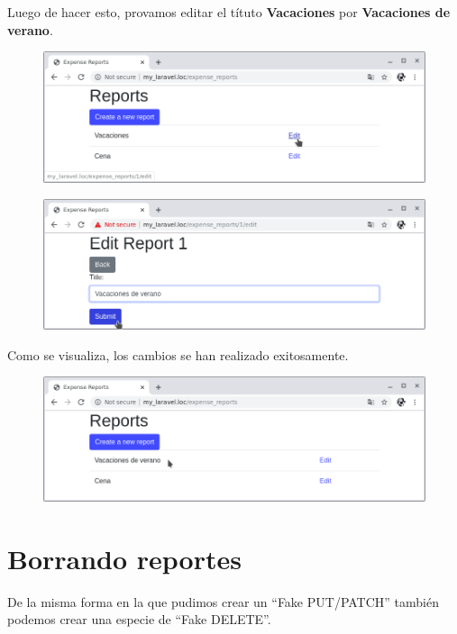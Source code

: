 \documentclass{article}
\begin{document}
Luego de hacer esto, provamos editar el títuto \textbf{Vacaciones} por
\textbf{Vacaciones de verano}.

\newpage

\begin{figure}[h!]
  \centering
  \includegraphics[scale=0.5]{./Pictures/074_edit_vacaciones.png}
\end{figure}

\begin{figure}[h!]
  \centering
  \includegraphics[scale=0.5]{./Pictures/075_vacaciones_verano.png}
\end{figure}

Como se visualiza, los cambios se han realizado exitosamente.

\begin{figure}[h!]
  \centering
  \includegraphics[scale=0.5]{./Pictures/076_update_ok.png}
\end{figure}

\newpage


\section{Borrando reportes}%
De la misma forma en la que pudimos crear un “Fake PUT/PATCH” también podemos
crear una especie de “Fake DELETE”.\\
\end{document}

